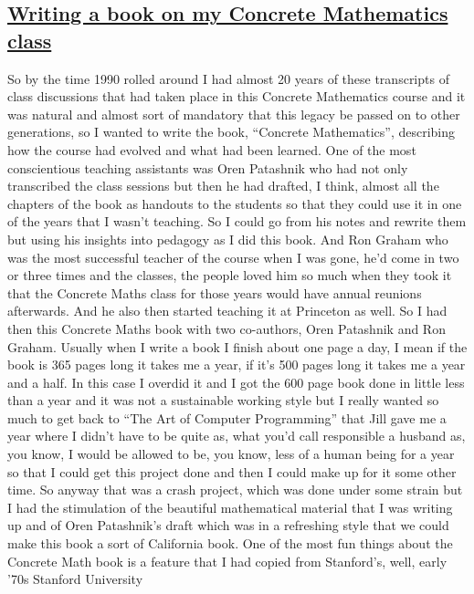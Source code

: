 \documentclass[]{article}
\begin{document}
\subsection{\texorpdfstring{\href{http://webofstories.com/play/17139}{Writing
a book on my Concrete Mathematics
class}}{Writing a book on my Concrete Mathematics class}}\label{writing-a-book-on-my-concrete-mathematics-class}

So by the time 1990 rolled around I had almost 20 years of these
transcripts of class discussions that had taken place in this Concrete
Mathematics course and it was natural and almost sort of mandatory that
this legacy be passed on to other generations, so I wanted to write the
book, ``Concrete Mathematics'', describing how the course had evolved
and what had been learned. One of the most conscientious teaching
assistants was Oren Patashnik who had not only transcribed the class
sessions but then he had drafted, I think, almost all the chapters of
the book as handouts to the students so that they could use it in one of
the years that I wasn't teaching. So I could go from his notes and
rewrite them but using his insights into pedagogy as I did this book.
And Ron Graham who was the most successful teacher of the course when I
was gone, he'd come in two or three times and the classes, the people
loved him so much when they took it that the Concrete Maths class for
those years would have annual reunions afterwards. And he also then
started teaching it at Princeton as well. So I had then this Concrete
Maths book with two co-authors, Oren Patashnik and Ron Graham. Usually
when I write a book I finish about one page a day, I mean if the book is
365 pages long it takes me a year, if it's 500 pages long it takes me a
year and a half. In this case I overdid it and I got the 600 page book
done in little less than a year and it was not a sustainable working
style but I really wanted so much to get back to ``The Art of Computer
Programming'' that Jill gave me a year where I didn't have to be quite
as, what you'd call responsible a husband as, you know, I would be
allowed to be, you know, less of a human being for a year so that I
could get this project done and then I could make up for it some other
time. So anyway that was a crash project, which was done under some
strain but I had the stimulation of the beautiful mathematical material
that I was writing up and of Oren Patashnik's draft which was in a
refreshing style that we could make this book a sort of California book.
One of the most fun things about the Concrete Math book is a feature
that I had copied from Stanford's, well, early '70s Stanford University
\end{document}
